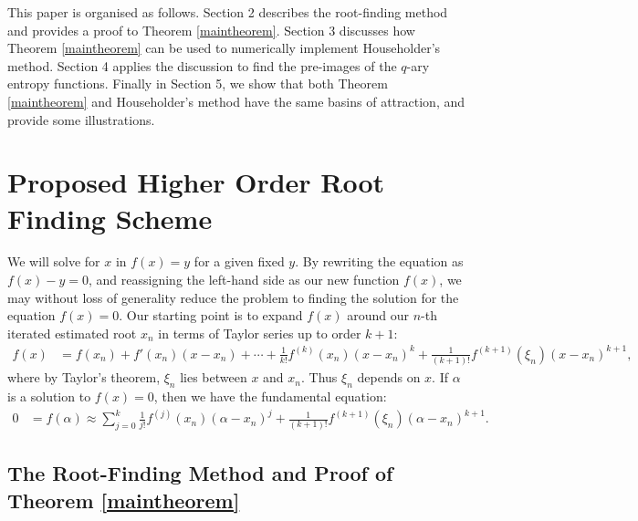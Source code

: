 \documentclass{article}
\begin{document}
This paper is organised as follows. Section 2 describes the root-finding method and provides a proof to Theorem \ref{maintheorem}. Section 3 discusses how Theorem \ref{maintheorem} can be used to numerically implement Householder's method. Section 4 applies the discussion to find the pre-images of the $q$-ary entropy functions.  Finally in Section 5, we show that both Theorem \ref{maintheorem} and Householder's method have the same basins of attraction, and provide some illustrations.

\section{Proposed Higher Order Root Finding Scheme}\label{section2}

We will solve for $x$ in $f(x)=y$ for a given fixed $y$. By rewriting the equation as $f(x)-y=0$, and reassigning the left-hand side as our new function $f(x)$, we may without loss of generality reduce the problem to finding the solution for the equation $f(x)=0$. Our starting point is to expand $f(x)$ around our $n$-th iterated estimated root $x_{n}$ in terms of Taylor series up to order $k+1$:
\begin{equation*}
\begin{aligned}
f(x) &= f(x_{n})+f'(x_{n})(x-x_{n})+\cdots  + \frac{1}{k!}f^{(k)}(x_{n})(x-x_{n})^{k}+\frac{1}{(k+1)!}f^{(k+1)}(\xi_{n})(x-x_{n})^{k+1},
\end{aligned}
\end{equation*}
where by Taylor's theorem, $\xi_{n}$ lies between $x$ and $x_{n}$. Thus $\xi_{n}$ depends on $x$. If $\alpha$ is a solution to $f(x)=0$, then we have the fundamental equation:
\begin{equation*}
\begin{aligned}
0 &= f(\alpha)\approx \sum_{j=0}^{k}\frac{1}{j!}f^{(j)}(x_{n})(\alpha-x_{n})^{j}+\frac{1}{(k+1)!}f^{(k+1)}(\xi_{n})(\alpha-x_{n})^{k+1}. %
\end{aligned}
\end{equation*}



\subsection{The Root-Finding Method and Proof of Theorem \ref{maintheorem}}\label{algo-subsect}
\end{document}
